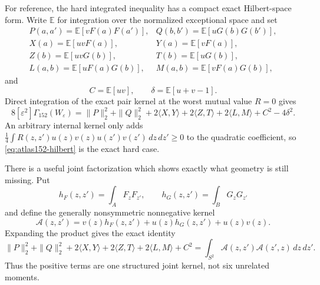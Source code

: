 \documentclass[11pt]{article}
\begin{document}
For reference, the hard integrated inequality has a compact exact
Hilbert-space form.  Write $\mathbb E$ for integration over the normalized
exceptional space and set
\[
\begin{array}{ll}
 P(a,a')=\mathbb E[vF(a)F(a')],&
 Q(b,b')=\mathbb E[uG(b)G(b')],\\
 X(a)=\mathbb E[uvF(a)],&Y(a)=\mathbb E[vF(a)],\\
 Z(b)=\mathbb E[uvG(b)],&T(b)=\mathbb E[uG(b)],\\
 L(a,b)=\mathbb E[uF(a)G(b)],&
 M(a,b)=\mathbb E[vF(a)G(b)],
\end{array}
\]
and
\[
 C=\mathbb E[uv],\qquad
 \delta=\mathbb E[u+v-1].
\]
Direct integration of the exact pair kernel at the worst mutual value
$R=0$ gives
\begin{equation}
 8[\varepsilon^2]\Gamma_{152}(W_\varepsilon)
 =\|P\|_2^2+\|Q\|_2^2
 +2\langle X,Y\rangle+2\langle Z,T\rangle
 +2\langle L,M\rangle+C^2-4\delta^2.
 \label{eq:atlas152-hilbert}
\end{equation}
An arbitrary internal kernel only adds
$\frac14\int R(z,z')u(z)v(z)u(z')v(z')\,dz\,dz'\geq0$ to the quadratic
coefficient, so \eqref{eq:atlas152-hilbert} is the exact hard case.

There is a useful joint factorization which shows exactly what geometry is
still missing.  Put
\[
 h_F(z,z')=\int_A F_zF_{z'},\qquad
 h_G(z,z')=\int_B G_zG_{z'}
\]
and define the generally nonsymmetric nonnegative kernel
\[
 \mathcal A(z,z')=
 v(z)h_F(z,z')+u(z)h_G(z,z')+u(z)v(z).
\]
Expanding the product gives the exact identity
\begin{equation}
 \|P\|_2^2+\|Q\|_2^2+2\langle X,Y\rangle
 +2\langle Z,T\rangle+2\langle L,M\rangle+C^2
 =\int_{S^2}\mathcal A(z,z')\mathcal A(z',z)\,dz\,dz'.
 \label{eq:joint-factor}
\end{equation}
Thus the positive terms are one structured joint kernel, not six unrelated
moments.
\end{document}

